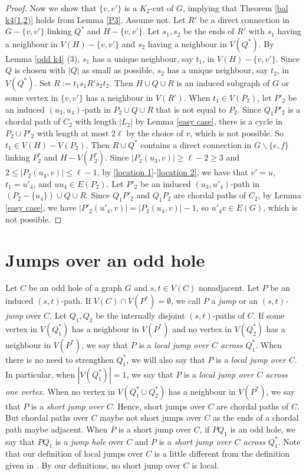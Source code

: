 \documentclass[11pt]{article}
\newcommand{\del}{\backslash}
\begin{document}
\begin{proof}
Now we show that $\{v,v'\}$ is a $K_2$-cut of $G$, implying that Theorem \ref{bal k4(1,2)} holds from Lemma \ref{P3}. Assume not. Let $R'$ be a direct connection in $G-\{v,v'\}$ linking $Q^*$ and $H-\{v,v'\}$. Let $s_1,s_2$ be the ends of $R'$ with $s_1$ having a neighbour in $V(H)-\{v,v'\}$ and $s_2$ having a neighbour in $V(Q^*)$. By Lemma \ref{odd k4} (3), $s_1$ has a unique neighbour, say $t_1$, in $V(H)-\{v,v'\}$. Since $Q$ is chosen with $|Q|$ as small as possible, $s_2$ has a unique neighbour, say $t_2$, in $V(Q^*)$. Set $R:=t_1s_1R's_2t_2$. Then $H\cup Q\cup R$ is an induced subgraph of $G$ or some vertex in $\{v,v'\}$ has a neighbour in $V(R')$. When $t_1\in V(P_2)$, let $P'_2$ be an induced $(u_3,u_4)$-path in $P_2\cup Q\cup R$ that is not equal to $P_2$. Since $Q_1P'_2$ is a chordal path of $C_2$ with length $|L_2|$ by Lemma \ref{easy case}, there is a cycle in $P_2\cup P'_2$ with length at most $2\ell$ by the choice of $v$, which is not possible. So $t_1\in V(H)-V(P_2)$. Then $R\cup Q^*$ contains a direct connection in $G\del\{e,f\}$ linking $P_2^*$ and $H-V(P_2^*)$. Since $|P_2(u_3,v)|\geq\ell-2\geq3$ and $2\leq |P_2(u_4,v)|\leq \ell-1$, by \ref{location 1}-\ref{location 2}, we have that $v'=u$, $t_1=u'_4$, and $uu_4\in E(P_2)$. Let $P'_2$ be an induced $(u_3,u'_4)$-path in $(P_2-\{u_4\})\cup Q\cup R$. Since $Q_1P'_2$ and $Q_1P_2$ are chordal paths of $C_2$, by Lemma \ref{easy case}, we have $|P'_2(u'_4,v)|=|P_2(u_4,v)|-1$, so $u'_4v\in E(G)$, which is not possible.
\end{proof}


\section{Jumps over an odd hole}
Let $C$ be an odd hole of a graph $G$ and $s,t\in V(C)$ nonadjacent. Let $P$ be an induced $(s,t)$-path. If $V(C)\cap V(P^*)=\emptyset$, we call $P$ a {\em jump} or an {\em $(s,t)$-jump} over $C$. Let $Q_1,Q_2$ be the internally disjoint $(s,t)$-paths of $C$.
If some vertex in $V(Q^*_1)$ has a neighbour in $V(P^*)$ and no vertex in $V(Q^*_2)$ has a neighbour in $V(P^*)$, we say that $P$ is a {\em local jump over $C$ across $Q^*_1$}. When there is no need to strengthen $Q^*_1$, we will also say that $P$ is a {\em local jump over $C$}. In particular, when $|V(Q^*_1)|=1$, we say that $P$ is a {\em local jump over $C$ across one vertex}. When no vertex in $V(Q^*_1\cup Q^*_2)$ has a neighbour in $V(P^*)$, we say that $P$ is a {\em short jump over $C$}. Hence, short jumps over $C$ are chordal paths of $C$. But chordal paths over $C$ maybe not short jumps over $C$ as the ends of a chordal path maybe adjacent.
When $P$ is a short jump over $C$, if $PQ_1$ is an odd hole, we say that $PQ_1$ is a {\em jump hole} over $C$ and $P$ is a {\em short jump over $C$ across $Q^*_1$}. Note that our definition of local jumps over $C$ is a little different from the definition given in \cite{MC22}. By our definitions, no short jump  over $C$ is local.
\end{document}
